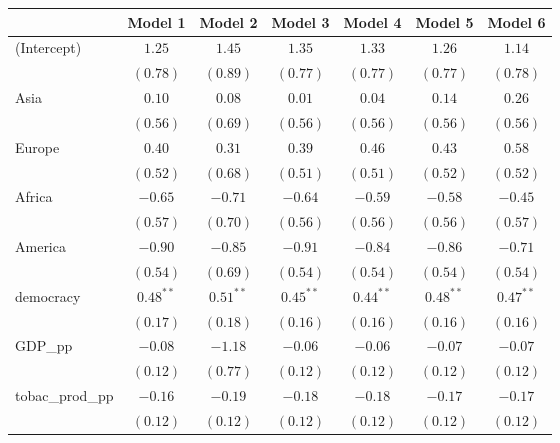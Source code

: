 
\begin{table}[!h]
\begin{center}
\begin{tabular}{l c c c c c c }
\toprule
 & Model 1 & Model 2 & Model 3 & Model 4 & Model 5 & Model 6 \\
\midrule
(Intercept)             & $1.25$      & $1.45$      & $1.35$      & $1.33$      & $1.26$      & $1.14$      \\
                        & $(0.78)$    & $(0.89)$    & $(0.77)$    & $(0.77)$    & $(0.77)$    & $(0.78)$    \\
Asia                    & $0.10$      & $0.08$      & $0.01$      & $0.04$      & $0.14$      & $0.26$      \\
                        & $(0.56)$    & $(0.69)$    & $(0.56)$    & $(0.56)$    & $(0.56)$    & $(0.56)$    \\
Europe                  & $0.40$      & $0.31$      & $0.39$      & $0.46$      & $0.43$      & $0.58$      \\
                        & $(0.52)$    & $(0.68)$    & $(0.51)$    & $(0.51)$    & $(0.52)$    & $(0.52)$    \\
Africa                  & $-0.65$     & $-0.71$     & $-0.64$     & $-0.59$     & $-0.58$     & $-0.45$     \\
                        & $(0.57)$    & $(0.70)$    & $(0.56)$    & $(0.56)$    & $(0.56)$    & $(0.57)$    \\
America                 & $-0.90$     & $-0.85$     & $-0.91$     & $-0.84$     & $-0.86$     & $-0.71$     \\
                        & $(0.54)$    & $(0.69)$    & $(0.54)$    & $(0.54)$    & $(0.54)$    & $(0.54)$    \\
democracy               & $0.48^{**}$ & $0.51^{**}$ & $0.45^{**}$ & $0.44^{**}$ & $0.48^{**}$ & $0.47^{**}$ \\
                        & $(0.17)$    & $(0.18)$    & $(0.16)$    & $(0.16)$    & $(0.16)$    & $(0.16)$    \\
GDP\_pp                 & $-0.08$     & $-1.18$     & $-0.06$     & $-0.06$     & $-0.07$     & $-0.07$     \\
                        & $(0.12)$    & $(0.77)$    & $(0.12)$    & $(0.12)$    & $(0.12)$    & $(0.12)$    \\
tobac\_prod\_pp         & $-0.16$     & $-0.19$     & $-0.18$     & $-0.18$     & $-0.17$     & $-0.17$     \\
                        & $(0.12)$    & $(0.12)$    & $(0.12)$    & $(0.12)$    & $(0.12)$    & $(0.12)$    \\

\end{tabular}
\end{center}
\end{table}
